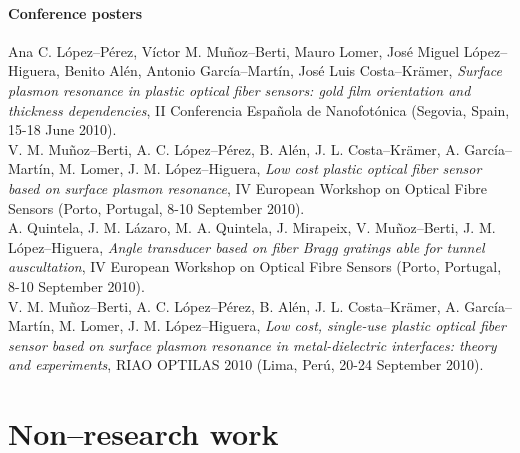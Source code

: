 \documentclass[11pt, a4paper]{article}
\newcommand{\years}[1]{\marginnote{\scriptsize #1}}
\begin{document}
\subsection*{Conference posters}
\noindent
\years{2010}Ana C. López--Pérez, Víctor M. Muñoz--Berti, Mauro Lomer, José Miguel López--Higuera, Benito Alén, Antonio García--Martín, José Luis Costa--Krämer, \textit{Surface plasmon resonance in plastic optical fiber sensors: gold film orientation and thickness dependencies}, II Conferencia Española de Nanofotónica (Segovia, Spain, 15-18 June 2010).\\
\years{2010}V. M. Muñoz--Berti, A. C. López--Pérez, B. Alén, J. L. Costa--Krämer, A. García--Martín, M. Lomer, J. M. López--Higuera, \textit{Low cost plastic optical fiber sensor based on surface plasmon resonance}, IV European Workshop on Optical Fibre Sensors (Porto, Portugal, 8-10 September 2010).\\
\years{2010}A. Quintela, J. M. Lázaro, M. A. Quintela, J. Mirapeix, V. Muñoz--Berti, J. M. López--Hi\-gue\-ra, \textit{Angle transducer based on fiber Bragg gratings able for tunnel auscultation}, IV European Workshop on Optical Fibre Sensors (Porto, Portugal, 8-10 September 2010).\\
\years{2010}V. M. Muñoz--Berti, A. C. López--Pérez, B. Alén, J. L. Costa--Krämer, A. García--Martín, M. Lomer, J. M. López--Higuera, \textit{Low cost, single-use plastic optical fiber sensor based on surface plasmon resonance in metal-dielectric interfaces: theory and experiments}, RIAO OPTILAS 2010 (Lima, Perú, 20-24 September 2010).


\newpage
\part*{Non--research work}
\end{document}
